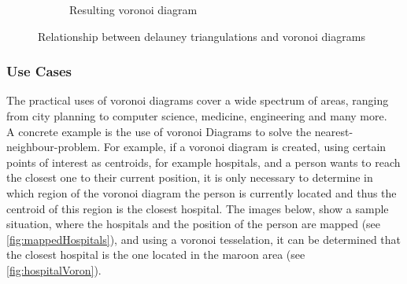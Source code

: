 \begin{center}
\begin{figure}[H]
\begin{subfigure}[b]{0.45\textwidth}
            \caption{Resulting voronoi diagram}
            \label{fig:delauneyVoronoi}
        \end{subfigure}
        \caption{Relationship between delauney triangulations and voronoi diagrams}
        \label{fig:delauneyVoronoi}
    \end{figure}
\end{center}

\subsubsection{Use Cases}

The practical uses of voronoi diagrams cover a wide spectrum of areas, ranging from city planning to computer science, medicine, engineering and many more.\\

A concrete example is the use of voronoi Diagrams to solve the nearest-neighbour-problem. For example, if a voronoi diagram is created, using certain points of interest as centroids, for example hospitals, and a person wants to reach the closest one to their current position, it is only necessary to determine in which region of the voronoi diagram the person is currently located and thus the centroid of this region is the closest hospital. The images below, show a sample situation, where the hospitals and the position of the person are mapped (see \ref{fig:mappedHospitals}), and using a voronoi tesselation, it can be determined that the closest hospital is the one located in the maroon area (see \ref{fig:hospitalVoron}). 

